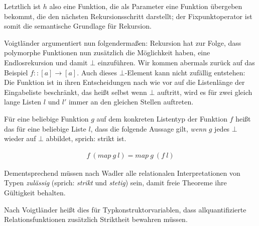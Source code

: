 Letztlich ist $h$ also eine Funktion, die als Parameter eine Funktion übergeben bekommt, die den nächsten Rekursionsschritt
darstellt; der Fixpunktoperator ist somit die semantische Grundlage für Rekursion.

Voigtländer \cite{voigtlander} argumentiert nun folgendermaßen: Rekursion hat zur Folge, dass polymorphe Funktionen
nun zusätzlich die Möglichkeit haben, eine Endlosrekursion und damit $\bot$ einzuführen. Wir kommen abermals zurück auf das
Beispiel $f :: [a] \rightarrow [a]$.
Auch dieses $\bot$-Element kann nicht zufällig entstehen: Die Funktion ist in ihren Entscheidungen nach wie vor auf
die Listenlänge der Eingabeliste beschränkt, das heißt selbst wenn $\bot$ auftritt, wird es für zwei gleich lange Listen
$l$ und $l'$ immer an den gleichen Stellen auftreten.

Für eine beliebige Funktion $g$ auf dem konkreten Listentyp der Funktion $f$ heißt das für eine beliebige Liste $l$, dass die folgende
Aussage gilt, \textit{wenn} $g$ jedes $\bot$ wieder auf $\bot$ abbildet, sprich: strikt ist.

\begin{align*}
f\ (map\ g\ l) = map\ g\ (f\ l)
\end{align*}




Dementsprechend müssen nach Wadler \cite{wadler} alle relationalen Interpretationen von Typen \textit{zulässig} (sprich: 
\textit{strikt} und \textit{stetig}) sein, damit freie Theoreme ihre Gültigkeit behalten.

Nach Voigtländer \cite{voigtlander} heißt dies für Typkonstruktorvariablen, dass allquantifizierte Relationsfunktionen zusätzlich
Striktheit bewahren müssen.


